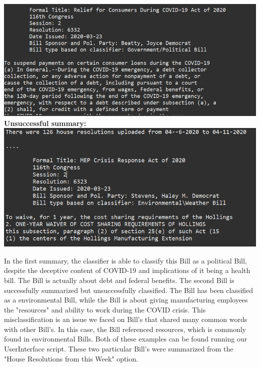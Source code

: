 \documentclass[11pt,a4paper]{article}
\begin{document}
 \noindent\includegraphics[scale=.60]{figs/Screenshot2.PNG}
 \newlinenewline\noindent\textbf{Unsuccessful summary:}
  \newline
  \includegraphics[scale=.60]{figs/Screenshot3.PNG}
  \newline
  
    In the first summary, the classifier is able to classify this Bill as a political Bill, despite the deceptive content of COVID-19 and implications of it being a health bill. The Bill is actually about debt and federal benefits.
  The second Bill is successfully summarized but unsuccessfully classified. The Bill has been classified as a environmental Bill, while the Bill is about giving manufacturing employees the "resources" and ability to work during the COVID crisis. This misclassification is an issue we faced on Bill's that shared many common words with other Bill's. In this case, the Bill referenced resources, which is commonly found in environmental Bills. Both of these examples can be found running our UserInterface script. These two particular Bill's were summarized from the "House Resolutions from this Week" option.

  
  
\end{document}
